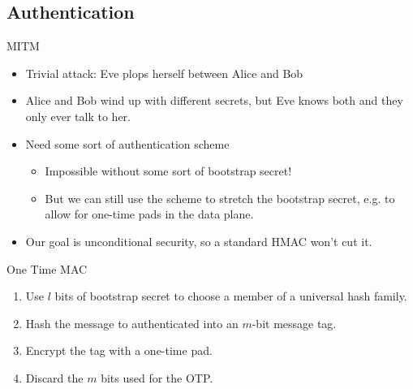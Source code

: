\documentclass[pdf]{beamer}
\begin{document}
\subsection{Authentication}
\begin{frame}{MITM}
  \begin{itemize}
  \item Trivial attack: Eve plops herself between Alice and Bob
  \pause\item Alice and Bob wind up with different secrets, but Eve knows
    both and they only ever talk to her.
  \pause\item Need some sort of authentication scheme
    \begin{itemize}
    \item Impossible without some sort of bootstrap secret!
    \item But we can still use the scheme to stretch the bootstrap secret,
      e.g. to allow for one-time pads in the data plane.
    \end{itemize}
  \pause\item Our goal is unconditional security, so a standard HMAC won't cut it.
  \end{itemize}
\end{frame}
\begin{frame}{One Time MAC}
  \begin{enumerate}
  \item Use $l$ bits of bootstrap secret to choose a member of a universal hash
    family.
  \pause\item Hash the message to authenticated into an $m$-bit message tag.
  \pause\item Encrypt the tag with a one-time pad.
  \pause\item Discard the $m$ bits used for the OTP.
  \end{enumerate}
\end{frame}
\end{document}
